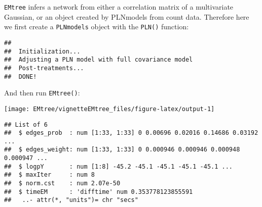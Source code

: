\texttt{EMtree} infers a network from either a correlation matrix of a
multivariate Gaussian, or an object created by PLNmodels from count
data. Therefore here we first create a \texttt{PLNmodels} object with
the \texttt{PLN()} function:

\begin{Shaded}
\begin{Highlighting}[]
\OperatorTok{~}\StringTok{ }\OperatorTok{\$}
\end{Highlighting}
\end{Shaded}

\begin{verbatim}
## 
##  Initialization...
##  Adjusting a PLN model with full covariance model
##  Post-treatments...
##  DONE!
\end{verbatim}

And then run \texttt{EMtree()}:

\begin{Shaded}
\begin{Highlighting}[]
 \NormalTok{, }\NormalTok{, }\NormalTok{)}
\end{Highlighting}
\end{Shaded}

\begin{center}\texttt{[image: EMtree/vignetteEMtree\_files/figure-latex/output-1]} \end{center}

\begin{Shaded}
\begin{Highlighting}[]
\end{Highlighting}
\end{Shaded}

\begin{verbatim}
## List of 6
##  $ edges_prob  : num [1:33, 1:33] 0 0.00696 0.02016 0.14686 0.03192 ...
##  $ edges_weight: num [1:33, 1:33] 0 0.000946 0.000946 0.000948 0.000947 ...
##  $ logpY       : num [1:8] -45.2 -45.1 -45.1 -45.1 -45.1 ...
##  $ maxIter     : num 8
##  $ norm.cst    : num 2.07e-50
##  $ timeEM      : 'difftime' num 0.353778123855591
##   ..- attr(*, "units")= chr "secs"
\end{verbatim}

